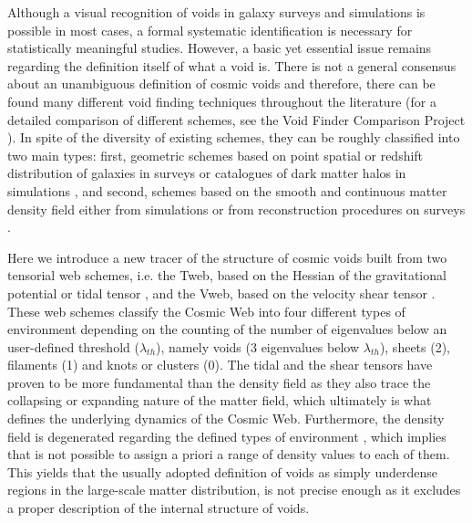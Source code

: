 \documentclass[a4,useAMS,usenatbib,usegraphicx]{latex/mn2e}
\begin{document}
Although a visual recognition of voids in galaxy surveys and simulations
is possible in most cases, a formal systematic identification is necessary 
for statistically meaningful studies. However, a basic yet essential issue 
remains regarding the definition itself of what a void is. There is not a 
general consensus about an unambiguous definition of cosmic voids and 
therefore, there can be found many different void finding techniques 
throughout the literature (for a detailed comparison of different schemes, 
see the Void Finder Comparison Project \citet{Colberg08}). In spite of the 
diversity of existing schemes, they can be roughly classified into two 
main types: first, geometric schemes based on point spatial or redshift 
distribution of galaxies in surveys or catalogues of dark matter halos in 
simulations \citep{Kauffmann91, Muller00, Gottlober03, Hoyle04, Brunino07, 
Foster09, Micheletti14, Sutter14}, and second, schemes based on the smooth 
and continuous matter density field either from simulations or from 
reconstruction procedures on surveys \citep{Plionis02, Colberg05, 
Shandarin06, Platen07, Neyrinck08, Neyrinck13, Ricciardelli2013}.


Here we introduce a new tracer of the structure of cosmic voids built from 
two tensorial web schemes, i.e. the Tweb, based on the Hessian of the 
gravitational potential or tidal tensor \citep{Hahn07, Forero09}, and the 
Vweb, based on the velocity shear tensor \citep{Hoffman12}. These web 
schemes classify the Cosmic Web into four different types of environment
depending on the counting of the number of eigenvalues below an 
user-defined threshold ($\lambda_{th}$), namely voids (3 eigenvalues below
$\lambda_{th}$), sheets (2), filaments (1) and knots or clusters (0).
The tidal and the shear tensors have proven to be more fundamental than 
the density field as they also trace the collapsing or expanding nature of 
the matter field, which ultimately is what defines the underlying dynamics 
of the Cosmic Web. Furthermore, the density field is degenerated regarding 
the defined types of environment \citep{Hahn07}, which implies that is not 
possible to assign a priori a range of density values to each of them. 
This yields that the usually adopted definition of voids as simply 
underdense regions in the large-scale matter distribution, is not precise 
enough as it excludes a proper description of the internal structure of 
voids.
\end{document}
